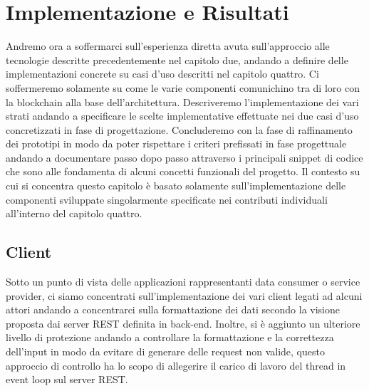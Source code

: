 \chapter{Implementazione e Risultati}
Andremo ora a soffermarci sull'esperienza diretta avuta sull'approccio alle tecnologie descritte precedentemente nel capitolo due, andando a definire delle implementazioni concrete su casi d'uso descritti nel capitolo quattro. Ci soffermeremo solamente su come le varie componenti comunichino tra di loro con la blockchain alla base dell'architettura. Descriveremo l'implementazione dei vari strati andando a specificare le scelte implementative effettuate nei due casi d'uso concretizzati in fase di progettazione. Concluderemo con la fase di raffinamento dei prototipi in modo da poter rispettare i criteri prefissati in fase progettuale andando a documentare passo dopo passo attraverso i principali snippet di codice che sono alle fondamenta di alcuni concetti funzionali del progetto. Il contesto su cui si concentra questo capitolo è basato solamente sull'implementazione delle componenti sviluppate singolarmente specificate nei contributi individuali all'interno del capitolo quattro.
\section{Client}
Sotto un punto di vista delle applicazioni rappresentanti data consumer o service provider, ci siamo concentrati sull'implementazione dei vari client legati ad alcuni attori andando a concentrarci sulla formattazione dei dati secondo la visione proposta dai server REST definita in back-end. Inoltre, si è aggiunto un ulteriore livello di protezione andando a controllare la formattazione e la correttezza dell'input in modo da evitare di generare delle request non valide, questo approccio di controllo ha lo scopo di allegerire il carico di lavoro del thread in event loop sul server REST.
